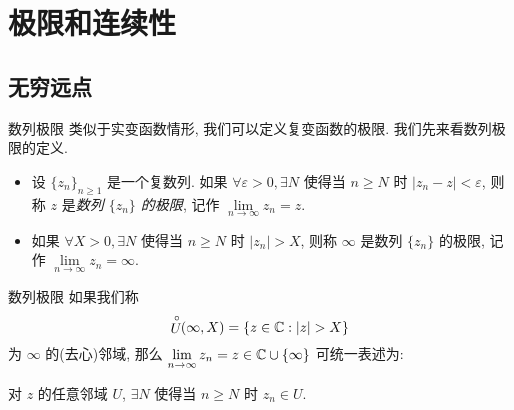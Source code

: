 \section{极限和连续性}


\subsection{无穷远点}
\begin{frame}{数列极限}
\onslide<+->
类似于实变函数情形, 我们可以定义复变函数的极限.
\onslide<+->
我们先来看数列极限的定义.

\begin{definition}
\begin{itemize}
\item 设 $\{z_n\}_{n\ge 1}$ 是一个复数列.
\alert{如果 $\forall \varepsilon>0,\exists N$ 使得当 $n\ge N$ 时 $|z_n-z|<\varepsilon$}, 则称 $z$ 是\emph{数列 $\{z_n\}$ 的极限}, 记作 \emph{$\lim\limits_{n\to\infty}z_n=z$}.
\item 如果 \alert{$\forall X>0,\exists N$ 使得当 $n\ge N$ 时 $|z_n|>X$}, 则称 $\infty$ 是数列 $\{z_n\}$ 的极限, 记作 $\lim\limits_{n\to\infty}z_n=\infty$.
\end{itemize}
\end{definition}
\end{frame}


\begin{frame}{数列极限}
\onslide<+->
如果我们称
\[\Uc(\infty,X)=\set{z\in\BC:|z|>X}\]
为 $\infty$ 的(去心)邻域,
\onslide<+->
那么 $\lim\limits_{n\to\infty}z_n=z\in{\mathbb{C}}\cup{\left\{\infty\right\}}$ 可统一表述为:

\onslide<+->
\begin{block@}
	对 $z$ 的任意邻域 $U$, $\exists N$ 使得当 $n\ge N$ 时 $z_n\in U$.
\end{block@}
\begin{center}
\end{center}
\end{frame}


